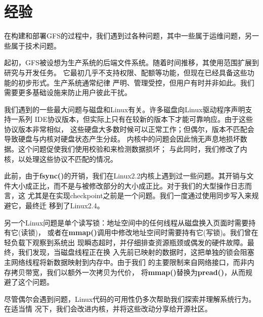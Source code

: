 \section{经验}

在构建和部署GFS的过程中，我们遇到过各种问题，其中一些属于运维问题，另一些属于技术问题。

起初，GFS被设想为生产系统的后端文件系统。随着时间推移，其使用范围扩展到研究与开发任务。
它最初几乎不支持权限、配额等功能，但现在已经具备这些功能的初步形式。生产系统通常纪律
严明、管理受控，但用户有时并非如此。我们需要更多基础设施来防止用户彼此干扰。

我们遇到的一些最大问题与磁盘和Linux有关。许多磁盘向Linux驱动程序声明支持一系列
IDE协议版本，但实际上只有在较新的版本下才能可靠响应。由于这些协议版本非常相似，
这些硬盘大多数时候可以正常工作；但偶尔，版本不匹配会导致硬盘与内核对硬盘状态产生分歧。
内核中的问题会因此悄无声息地损坏数据。这个问题促使我们使用校验和来检测数据损坏；
与此同时，我们修改了内核，以处理这些协议不匹配的情况。

此前，由于\textbf{fsync()}的开销，我们在Linux2.2内核上遇到过一些问题。其开销与文
件大小成正比，而不是与被修改部分的大小成正比。对于我们的大型操作日志而言，这
尤其是在实现checkpoint之前是一个问题。我们一度通过使用同步写入来规避它，最终迁
移到了Linux2.4。

另一个Linux问题是单个读写锁：地址空间中的任何线程从磁盘换入页面时需要持有它(读锁)，
或者在\textbf{mmap()}调用中修改地址空间时需要持有它(写锁)。我们曾在轻负载下观察到系统出
现瞬态超时，并仔细排查资源瓶颈或偶发的硬件故障。最终，我们发现，当磁盘线程正在换
入先前已映射的数据时，这把单独的锁会阻塞主网络线程将新数据映射到内存中。由于我们
的主要限制来自网络接口，而非内存拷贝带宽，我们以额外一次拷贝为代价，
将\textbf{mmap()}替换为\textbf{pread()}，从而规避了这个问题。

尽管偶尔会遇到问题，Linux代码的可用性仍多次帮助我们探索并理解系统行为。在适当情
况下，我们会改进内核，并将这些改动分享给开源社区。
